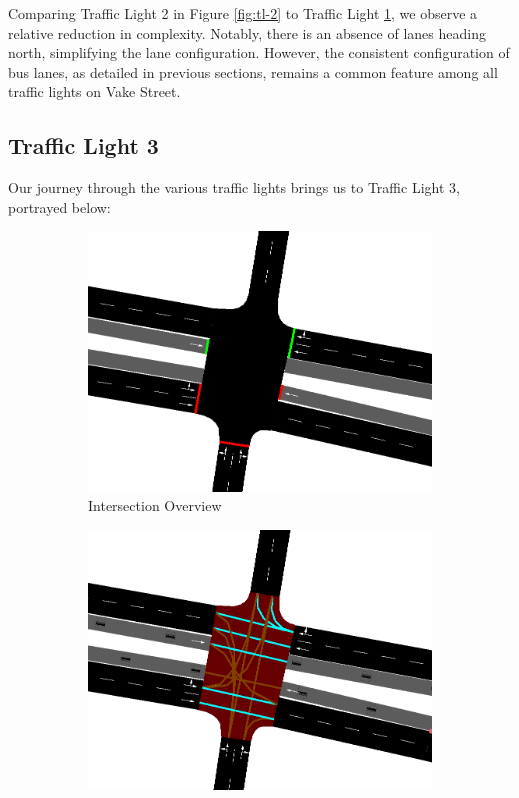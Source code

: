 Comparing Traffic Light 2 in Figure \ref{fig:tl-2} to Traffic Light \hyperref[sec:tl-1]{1}, we observe a relative reduction in complexity. Notably, there is an absence of lanes heading north, simplifying the lane configuration. However, the consistent configuration of bus lanes, as detailed in previous sections, remains a common feature among all traffic lights on Vake Street.

\subsection{Traffic Light 3} \label{sec:tl-3}
Our journey through the various traffic lights brings us to Traffic Light 3, portrayed below:

\begin{figure}[h]
    \centering
    \begin{subfigure}{0.45\textwidth}
        \centering
        \includegraphics[width=\linewidth]{images/methodology/tl-3-street.png}
        \caption{Intersection Overview}
    \end{subfigure}
    \hfill
    \begin{subfigure}{0.45\textwidth}
        \centering
        \includegraphics[width=\linewidth]{images/methodology/tl-3-directions.png}

\end{subfigure}
\end{figure}
